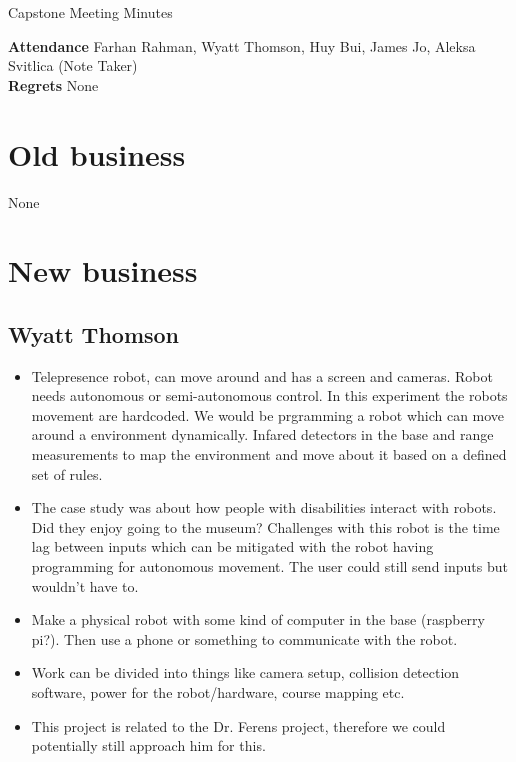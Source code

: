 \documentclass[a4paper]{article}
\begin{document}
	\begin{center}
		\huge Capstone Meeting Minutes
	\end{center}
	\textbf{Attendance} Farhan Rahman, Wyatt Thomson, Huy Bui, James Jo, Aleksa Svitlica (Note Taker) \\
	\textbf{Regrets} None \\
	
	\section{Old business}
	None
	\section{New business}
	
	\subsection{Wyatt Thomson}
	\begin{itemize}
		\item Telepresence robot, can move around and has a screen and cameras. Robot needs autonomous or semi-autonomous control. In this experiment the robots movement are hardcoded. We would be prgramming a robot which can move around a environment dynamically. Infared detectors in the base and range measurements to map the environment and move about it based on a defined set of rules.
		\item The case study was about how people with disabilities interact with robots. Did they enjoy going to the museum? Challenges with this robot is the time lag between inputs which can be mitigated with the robot having programming for autonomous movement. The user could still send inputs but wouldn't have to.
		\item Make a physical robot with some kind of computer in the base (raspberry pi?). Then use a phone or something to communicate with the robot.
		\item Work can be divided into things like camera setup, collision detection software, power for the robot/hardware, course mapping etc.
		\item This project is related to the Dr. Ferens project, therefore we could potentially still approach him for this.
		
	\end{itemize}
	
\end{document}
